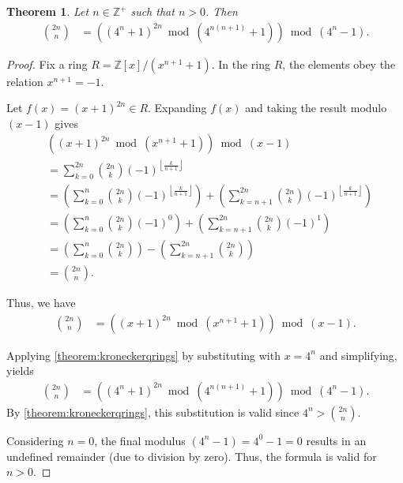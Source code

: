 \documentclass[12pt]{article}
\theoremstyle{plain}
\newtheorem{theorem}{Theorem}
\theoremstyle{definition}
\newcommand{\floor}[1]{\left\lfloor #1 \right\rfloor}
\begin{document}
\begin{theorem} \label{theorem:cbc}
Let $n \in \mathbb{Z}^+$ such that $n > 0$. Then
\begin{align*}
\binom{2n}{n} &= \left((4^n + 1)^{2n} \bmod{(4^{n(n+1)} + 1)}\right) \bmod{(4^n-1)} .
\end{align*}
\end{theorem}
\begin{proof}
Fix a ring $R = \mathbb{Z}[x]/(x^{n+1} + 1)$. In the ring $R$, the elements obey the relation $x^{n+1} = -1$.

Let $f(x) = (x + 1)^{2n} \in R$. Expanding $f(x)$ and taking the result modulo $(x-1)$ gives
\begin{align*}
& \left((x + 1)^{2n} \bmod{(x^{n+1} + 1)}\right) \bmod{(x-1)} \\
&= \sum_{k=0}^{2n} \binom{2n}{k} (-1)^{\floor{\frac{k}{n+1}}} \\
&= \left( \sum_{k=0}^{n} \binom{2n}{k} (-1)^{\floor{\frac{k}{n+1}}} \right) + \left( \sum_{k=n+1}^{2n} \binom{2n}{k} (-1)^{\floor{\frac{k}{n+1}}} \right) \\
&= \left( \sum_{k=0}^{n} \binom{2n}{k} (-1)^0 \right) + \left( \sum_{k=n+1}^{2n} \binom{2n}{k} (-1)^1 \right) \\
&= \left( \sum_{k=0}^{n} \binom{2n}{k} \right) - \left( \sum_{k=n+1}^{2n} \binom{2n}{k} \right) \\
&= \binom{2n}{n} .
\end{align*}

Thus, we have
\begin{align*}
    \binom{2n}{n} &= \left((x + 1)^{2n} \bmod{(x^{n+1} + 1)}\right) \bmod{(x-1)} .
\end{align*}

Applying \cref{theorem:kroneckerqrings} by substituting with $x = 4^n$ and simplifying, yields
\begin{align*}
    \binom{2n}{n} &= \left((4^n + 1)^{2n} \bmod{(4^{n(n+1)} + 1)}\right) \bmod{(4^n-1)} .
\end{align*}
By \cref{theorem:kroneckerqrings}, this substitution is valid since $4^n > \binom{2n}{n}$.

Considering $n = 0$, the final modulus $(4^n-1) = 4^0-1 = 0$ results in an undefined remainder (due to division by zero). Thus, the formula is valid for $n > 0$.
\end{proof}
\end{document}
